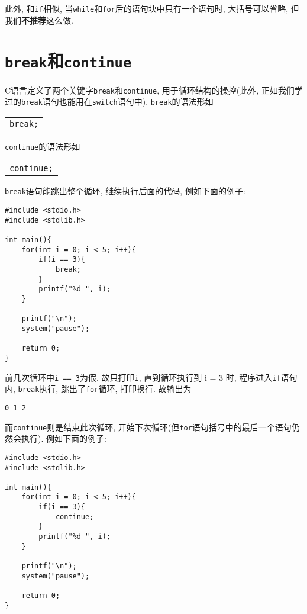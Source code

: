             此外, 和\texttt{if}相似, 当\texttt{while}和\texttt{for}后的语句块中只有一个语句时, 大括号可以省略, 但我们\textbf{不推荐}这么做.

    \section{\texttt{break}和\texttt{continue}}
            C语言定义了两个关键字\texttt{break}和\texttt{continue}, 用于循环结构的操控(此外, 正如我们学过的\texttt{break}语句也能用在\texttt{switch}语句中). \texttt{break}的语法形如
            \begin{center}
            \begin{longtable}{l}
                \texttt{break;} 
            \end{longtable}
            \end{center}
            \texttt{continue}的语法形如
            \begin{center}
            \begin{longtable}{l}
                \texttt{continue;} 
            \end{longtable}
            \end{center}

            \texttt{break}语句能跳出整个循环, 继续执行后面的代码, 例如下面的例子:
\begin{lstlisting}
#include <stdio.h>
#include <stdlib.h>

int main(){
    for(int i = 0; i < 5; i++){
        if(i == 3){
            break;
        }
        printf("%d ", i);
    }

    printf("\n");
    system("pause");

    return 0;
}
\end{lstlisting}

            前几次循环中\texttt{i == 3}为假, 故只打印\texttt{i}, 直到循环执行到 i = 3 时, 程序进入\texttt{if}语句内, \texttt{break}执行, 跳出了\texttt{for}循环, 打印换行. 故输出为
\begin{lstlisting}
0 1 2 
\end{lstlisting}

            而\texttt{continue}则是结束此次循环, 开始下次循环(但\texttt{for}语句括号中的最后一个语句仍然会执行). 例如下面的例子:
\begin{lstlisting}
#include <stdio.h>
#include <stdlib.h>

int main(){
    for(int i = 0; i < 5; i++){
        if(i == 3){
            continue;
        }
        printf("%d ", i);
    }

    printf("\n");
    system("pause");

    return 0;
}
\end{lstlisting}

